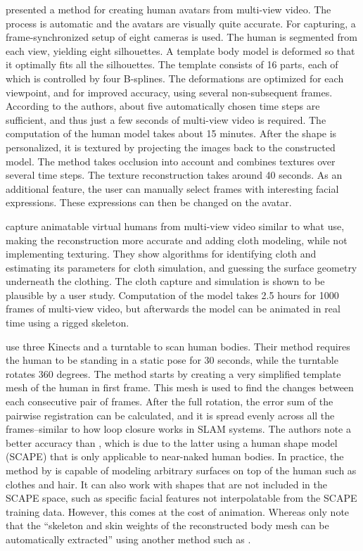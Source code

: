 \citet{ahmed2005automatic} presented a method for creating human avatars from multi-view video. The process is automatic and the avatars are visually quite accurate. For capturing, a frame-synchronized setup of eight cameras is used. The human is segmented from each view, yielding eight silhouettes. A template body model is deformed so that it optimally fits all the silhouettes. The template consists of 16 parts, each of which is controlled by four B-splines. The deformations are optimized for each viewpoint, and for improved accuracy, using several non-subsequent frames. According to the authors, about five automatically chosen time steps are sufficient, and thus just a few seconds of multi-view video is required. The computation of the human model takes about 15 minutes. After the shape is personalized, it is textured by projecting the images back to the constructed model. The method takes occlusion into account and combines textures over several time steps. The texture reconstruction takes around 40 seconds. As an additional feature, the user can manually select frames with interesting facial expressions. These expressions can then be changed on the avatar. \citep{ahmed2005automatic}

\citet{stoll2010video} capture animatable virtual humans from multi-view video similar to what \citet{ahmed2005automatic} use, making the reconstruction more accurate and adding cloth modeling, while not implementing texturing. They show algorithms for identifying cloth and estimating its parameters for cloth simulation, and guessing the surface geometry underneath the clothing. The cloth capture and simulation is shown to be plausible by a user study. Computation of the model takes 2.5 hours for 1000 frames of multi-view video, but afterwards the model can be animated in real time using a rigged skeleton. \citep{stoll2010video}

\citet{tongscanning} use three Kinects and a turntable to scan human bodies. Their method requires the human to be standing in a static pose for 30 seconds, while the turntable rotates 360 degrees. The method starts by creating a very simplified template mesh of the human in first frame. This mesh is used to find the changes between each consecutive pair of frames. After the full rotation, the error sum of the pairwise registration can be calculated, and it is spread evenly across all the frames--similar to how loop closure works in SLAM systems. The authors note a better accuracy than \citep{weiss2011home}, which is due to the latter using a human shape model (SCAPE) that is only applicable to near-naked human bodies. In practice, the method by \citeauthor{tongscanning} is capable of modeling arbitrary surfaces on top of the human such as clothes and hair. It can also work with shapes that are not included in the SCAPE space, such as specific facial features not interpolatable from the SCAPE training data. However, this comes at the cost of animation. Whereas  \citet{tongscanning} only note that the ``skeleton and skin weights of the reconstructed body mesh can be automatically extracted'' using another method such as \citep{baran2007automatic}.

